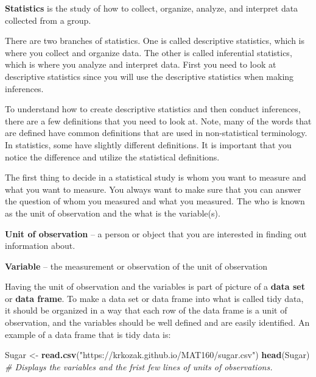 \documentclass[
]{book}
\newenvironment{Shaded}{\begin{snugshade}}{\end{snugshade}}
\newcommand{\CommentTok}[1]{\textcolor[rgb]{0.56,0.35,0.01}{\textit{#1}}}
\newcommand{\KeywordTok}[1]{\textcolor[rgb]{0.13,0.29,0.53}{\textbf{#1}}}
\newcommand{\NormalTok}[1]{#1}
\newcommand{\StringTok}[1]{\textcolor[rgb]{0.31,0.60,0.02}{#1}}
\begin{document}
\textbf{Statistics} is the study of how to collect, organize, analyze, and interpret data collected from a group.

There are two branches of statistics. One is called descriptive statistics, which is where you collect and organize data. The other is called inferential statistics, which is where you analyze and interpret data. First you need to look at descriptive statistics since you will use the descriptive statistics when making inferences.

To understand how to create descriptive statistics and then conduct inferences, there are a few definitions that you need to look at. Note, many of the words that are defined have common definitions that are used in non-statistical terminology. In statistics, some have slightly different definitions. It is important that you notice the difference and utilize the statistical definitions.

The first thing to decide in a statistical study is whom you want to measure and what you want to measure. You always want to make sure that you can answer the question of whom you measured and what you measured. The who is known as the unit of observation and the what is the variable(s).

\textbf{Unit of observation} -- a person or object that you are interested in finding out information about.

\textbf{Variable} -- the measurement or observation of the unit of observation

Having the unit of observation and the variables is part of picture of a \textbf{data set} or \textbf{data frame}. To make a data set or data frame into what is called tidy data, it should be organized in a way that each row of the data frame is a unit of observation, and the variables should be well defined and are easily identified. An example of a data frame that is tidy data is:

\begin{Shaded}
\begin{Highlighting}[]
\NormalTok{Sugar <-}\StringTok{ }\KeywordTok{read.csv}\NormalTok{(}\StringTok{"https://krkozak.github.io/MAT160/sugar.csv"}\NormalTok{)}
\KeywordTok{head}\NormalTok{(Sugar) }\CommentTok{# Displays the variables and the frist few lines of units of observations.}
\end{Highlighting}
\end{Shaded}
\end{document}
